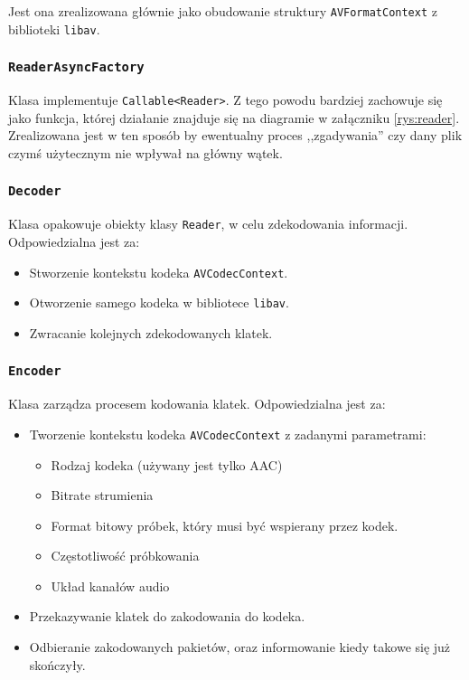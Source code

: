\documentclass[a4paper,12pt]{article}
\begin{document}
Jest ona zrealizowana głównie jako obudowanie struktury \texttt{AVFormatContext}
z biblioteki \texttt{libav}.

\subsubsection{\texttt{ReaderAsyncFactory}}

Klasa implementuje \texttt{Callable<Reader>}. Z tego powodu bardziej zachowuje
się jako funkcja, której działanie znajduje się na diagramie w załączniku
\ref{rys:reader}. Zrealizowana jest w ten sposób by ewentualny proces
,,zgadywania'' czy dany plik czymś użytecznym nie wpływał na główny wątek.

\subsubsection{\texttt{Decoder}}

Klasa opakowuje obiekty klasy \texttt{Reader}, w celu zdekodowania
informacji. Odpowiedzialna jest za: 
\begin{itemize}
    \item Stworzenie kontekstu kodeka \texttt{AVCodecContext}.
    \item Otworzenie samego kodeka w bibliotece \texttt{libav}.
    \item Zwracanie kolejnych zdekodowanych klatek.
\end{itemize}

\subsubsection{\texttt{Encoder}}

Klasa zarządza procesem kodowania klatek. Odpowiedzialna jest za: 
\begin{itemize}
    \item Tworzenie kontekstu kodeka \texttt{AVCodecContext} z zadanymi
        parametrami: 
        \begin{itemize}
            \item Rodzaj kodeka (używany jest tylko AAC)
            \item Bitrate strumienia
            \item Format bitowy próbek, który musi być wspierany przez kodek.
            \item Częstotliwość próbkowania
            \item Układ kanałów audio
        \end{itemize}
    \item Przekazywanie klatek do zakodowania do kodeka.
    \item Odbieranie zakodowanych pakietów, oraz informowanie kiedy takowe się
        już skończyły.
\end{itemize}
\end{document}
